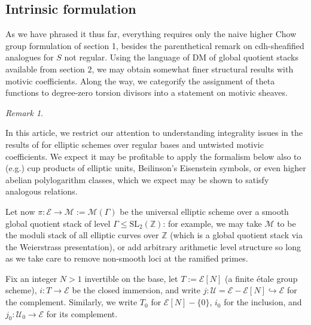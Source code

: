 \documentclass[a4paper,reqno,11pt]{amsart}
\theoremstyle{plain}
\theoremstyle{definition}
\theoremstyle{remark}
\newtheorem{remarkwr}[theorem]{Remark}
\newenvironment{remark}{\begin{remarkwr}\begin{upshape}}{\end{upshape}\end{remarkwr}}
\newcommand{\Z}{\mathbb{Z}}
\newcommand{\DM}{\mathrm{DM}}
\newcommand{\SL}{\mathrm{SL}}
\begin{document}
\subsection{Intrinsic formulation}

As we have phrased it thus far, everything requires only the naive higher Chow group formulation of section 1, besides the parenthetical remark on cdh-sheafified analogues for $S$ not regular. Using the language of $\DM$ of global quotient stacks available from section $2$, we may obtain somewhat finer structural results with motivic coefficients. Along the way, we categorify the assignment of theta functions to degree-zero torsion divisors into a statement on motivic sheaves. 

\begin{remark}In this article, we restrict our attention to understanding integrality issues in the results of \cite{BPPS} for elliptic schemes over regular bases and untwisted motivic coefficients. We expect it may be profitable to apply the formalism below also to (e.g.) cup products of elliptic units, Beilinson's Eisenstein symbols, or even higher abelian polylogarithm classes, which we expect may be shown to satisfy analogous relations.\end{remark}

Let now $\pi:\mathcal{E}\to \mathcal{M}:=\mathcal{M}(\Gamma)$ be the universal elliptic scheme over a smooth global quotient stack of level $\Gamma\le \SL_2(\Z)$: for example, we may take $\mathcal{M}$ to be the moduli stack of all elliptic curves over $\Z$ (which is a global quotient stack via the Weierstrass presentation), or add arbitrary arithmetic level structure so long as we take care to remove non-smooth loci at the ramified primes.

Fix an integer $N>1$ invertible on the base, let $T:=\mathcal{E}[N]$ (a finite \'{e}tale group scheme), $i:T\to \mathcal{E}$ be the closed immersion, and write $j:\mathcal{U}=\mathcal{E}-\mathcal{E}[N]\hookrightarrow \mathcal{E}$ for the complement. Similarly, we write $T_0$ for $\mathcal{E}[N]-\{0\}$, $i_0$ for the inclusion, and $j_0: \mathcal{U}_0\to \mathcal{E}$ for its complement.
\end{document}
